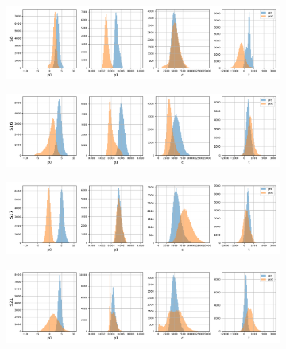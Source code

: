 \begin{figure}
\centering
\begin{subfigure}[H]{0.85\textwidth}
    \centering
    \includegraphics[width=\linewidth]{figures/chapter4/surrogates/p1_S8_histos.png}
  \end{subfigure}

\begin{subfigure}[b]{0.85\textwidth}
    \centering
    \includegraphics[width=\linewidth]{figures/chapter4/surrogates/p1_S16_histos.png}
  \end{subfigure}

\begin{subfigure}[b]{0.85\textwidth}
    \centering
    \includegraphics[width=\linewidth]{figures/chapter4/surrogates/p1_S17_histos.png}
  \end{subfigure}

\begin{subfigure}[b]{0.85\textwidth}
    \centering
    \includegraphics[width=\linewidth]{figures/chapter4/surrogates/p1_S21_histos.png}
  \end{subfigure}


\end{figure}
